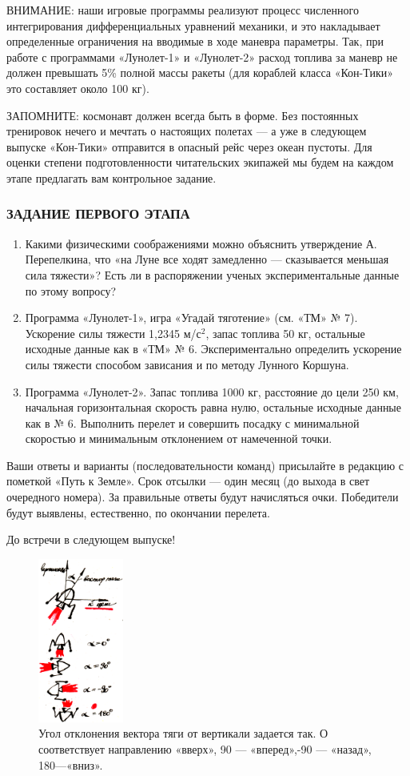 \documentclass[11pt,a4paper,oneside]{article}
\begin{document}
ВНИМАНИЕ: наши игровые программы реализуют процесс численного интегрирования дифференциальных уравнений механики, и это накладывает определенные ограничения на вводимые в ходе маневра параметры. Так, при работе с программами «Лунолет-1» и «Лунолет-2» расход топлива за маневр не должен превышать 5\% полной массы ракеты (для кораблей класса «Кон-Тики» это составляет около 100 кг).

ЗАПОМНИТЕ: космонавт должен всегда быть в форме. Без постоянных тренировок нечего и мечтать о настоящих полетах — а уже в следующем выпуске «Кон-Тики» отправится в опасный рейс через океан пустоты. Для оценки степени подготовленности читательских экипажей мы будем на каждом этапе предлагать вам контрольное задание.

\subsubsection{ЗАДАНИЕ ПЕРВОГО ЭТАПА}
\begin{enumerate}
\item Какими физическими соображениями можно объяснить утверждение А. Перепелкина, что «на Луне все ходят замедленно — сказывается меньшая сила тяжести»? Есть ли в распоряжении ученых экспериментальные данные по этому вопросу?
\item Программа «Лунолет-1», игра «Угадай тяготение» (см. «ТМ» № 7). Ускорение силы тяжести 1,2345 м/с$^{2}$, запас топлива 50 кг, остальные исходные данные как в «ТМ» № 6. Экспериментально определить ускорение силы тяжести способом зависания и по методу Лунного Коршуна.
\item Программа «Лунолет-2». Запас топлива 1000 кг, расстояние до цели 250 км, начальная горизонтальная скорость равна нулю, остальные исходные данные как в № 6. Выполнить перелет и совершить посадку с минимальной скоростью и минимальным отклонением от намеченной точки.
\end{enumerate}

Ваши ответы и варианты (последовательности команд) присылайте в редакцию с пометкой «Путь к Земле». Срок отсылки — один месяц (до выхода в свет очередного номера). За правильные ответы будут начисляться очки. Победители будут выявлены, естественно, по окончании перелета.

До встречи в следующем выпуске!

\begin{figure}[H]
\includegraphics[width=0.25\textwidth]{lunolet2_angle}
\caption{Угол отклонения вектора тяги от вертикали задается так. О соответствует направлению «вверх», 90 — «вперед»,-90 — «назад», 180—«вниз».}
\end{figure}
\end{document}
